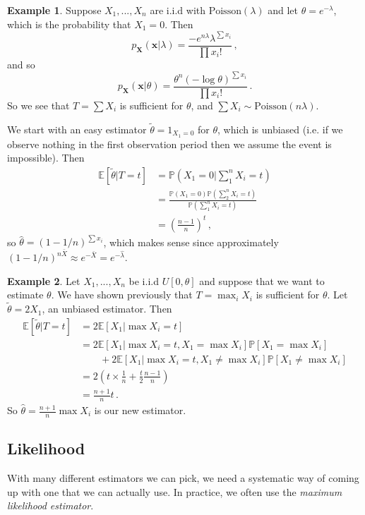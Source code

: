 \documentclass[a4paper,11pt]{article}
\theoremstyle{definition}
\newtheorem*{ex}{Example}
\numberwithin{equation}{section}
\begin{document}
\begin{ex}
Suppose $X_1,...,X_n$ are i.i.d with $\text{Poisson}(\lambda)$ and let $\theta=e^{-\lambda}$, which is the probability that $X_1=0$. Then
\[
p_\mathbf{X}(\mathbf{x}|\lambda)=\frac{-e^{n\lambda}\lambda^{\sum x_i}}{\prod x_i!}\,,
\]
and so 
\[
p_\mathbf{X}(\mathbf{x}|\theta)=\frac{\theta^n(-\log\theta)^{\sum x_i}}{\prod x_i!}\,.
\]
So we see that $T=\sum X_i$ is sufficient for $\theta$, and $\sum X_i\sim\text{Poisson}(n\lambda)$.

We start with an easy estimator $\tilde{\theta}=1_{X_1=0}$ for $\theta$, which is unbiased (i.e. if we observe nothing in the first observation period then we assume the event is impossible). Then
\begin{align*}
    \mathbb{E}[\tilde{\theta}|T=t]&=\mathbb{P}\left(X_1=0|\sum_1^nX_i=t\right)\\
    &=\frac{\mathbb{P}(X_1=0)\mathbb{P}(\sum_2^nX_i=t)}{\mathbb{P}(\sum_1^nX_i=t)}\\
    &=\left(\frac{n-1}{n}\right)^t\,,
\end{align*}
so $\hat{\theta}=(1-1/n)^{\sum x_i}$, which makes sense since approximately $(1-1/n)^{n\bar{X}}\approx e^{-\bar{X}}=e^{-\hat{\lambda}}$.
\end{ex}

\begin{ex}
Let $X_1,...,X_n$ be i.i.d $U[0,\theta]$ and suppose that we want to estimate $\theta$. We have shown previously that $T=\max_i X_i$ is sufficient for $\theta$. Let $\tilde{\theta}=2X_1$, an unbiased estimator. Then
\begin{align*}
    \mathbb{E}[\tilde{\theta}|T=t]&=2\mathbb{E}[X_1|\max X_i=t]\\
    &=2\mathbb{E}[X_1|\max X_i=t, X_1=\max X_i]\mathbb{P}[X_1=\max X_i]\\
    &\qquad+2\mathbb{E}[X_1|\max X_i=t,X_1\neq\max X_i]\mathbb{P}[X_1\neq\max X_i]\\
    &=2\left(t\times\frac{1}{n}+\frac{t}{2}\frac{n-1}{n}\right)\\
    &=\frac{n+1}{n}t\,.
\end{align*}
So $\hat{\theta}=\frac{n+1}{n}\max X_i$ is our new estimator.
\end{ex}

\subsection{Likelihood}
With many different estimators we can pick, we need a systematic way of coming up with one that we can actually use. In practice, we often use the \emph{maximum likelihood estimator}.
\end{document}
